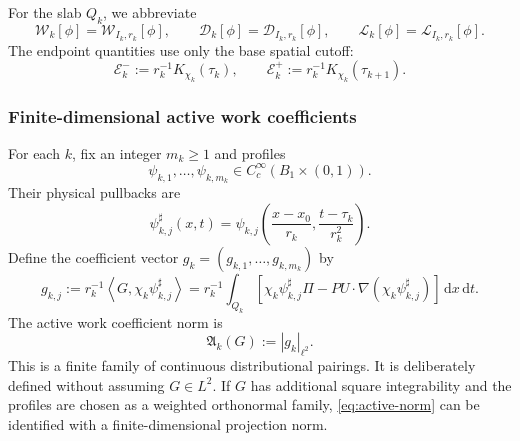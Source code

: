 \documentclass[11pt]{article}
\numberwithin{equation}{section}
\newcommand{\dxdt}{\,\mathrm dx\,\mathrm dt}
\newcommand{\pair}[2]{\left\langle #1,#2\right\rangle}
\newcommand{\W}{\mathcal W}
\newcommand{\D}{\mathcal D}
\newcommand{\Lk}{\mathcal L}
\newcommand{\Ek}{\mathcal E}
\newcommand{\Aact}{\mathfrak A}
\begin{document}
For the slab \(Q_k\), we abbreviate
\[
\W_k[\phi]=\W_{I_k,r_k}[\phi],
\qquad
\D_k[\phi]=\D_{I_k,r_k}[\phi],
\qquad
\Lk_k[\phi]=\Lk_{I_k,r_k}[\phi].
\]
The endpoint quantities use only the base spatial cutoff:
\begin{equation}\label{eq:E-endpoints}
\Ek_k^-:=r_k^{-1}K_{\chi_k}(\tau_k),
\qquad
\Ek_k^+:=r_k^{-1}K_{\chi_k}(\tau_{k+1}).
\end{equation}

\subsubsection{Finite-dimensional active work coefficients}

For each \(k\), fix an integer \(m_k\ge1\) and profiles
\begin{equation}\label{eq:profiles}
\psi_{k,1},\ldots,\psi_{k,m_k}
\in C_c^\infty(B_1\times(0,1)).
\end{equation}
Their physical pullbacks are
\begin{equation}\label{eq:pullback}
\psi_{k,j}^\sharp(x,t)
=
\psi_{k,j}\left(
\frac{x-x_0}{r_k},
\frac{t-\tau_k}{r_k^2}
\right).
\end{equation}
Define the coefficient vector \(g_k=(g_{k,1},\ldots,g_{k,m_k})\) by
\begin{equation}\label{eq:gcoeff}
g_{k,j}
:=
r_k^{-1}\pair{G}{\chi_k\psi_{k,j}^\sharp}
=
r_k^{-1}\int_{Q_k}
\left[
\chi_k\psi_{k,j}^\sharp\Pi
-
PU\cdot\nabla(\chi_k\psi_{k,j}^\sharp)
\right]\dxdt.
\end{equation}
The active work coefficient norm is
\begin{equation}\label{eq:active-norm}
\Aact_k(G):=|g_k|_{\ell^2}.
\end{equation}
This is a finite family of continuous distributional pairings. It is deliberately defined without assuming \(G\in L^2\). If \(G\) has additional square integrability and the profiles are chosen as a weighted orthonormal family, \eqref{eq:active-norm} can be identified with a finite-dimensional projection norm.
\end{document}
